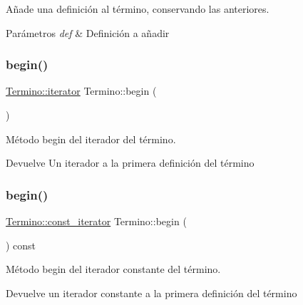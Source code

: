 Añade una definición al término, conservando las anteriores. 


\begin{DoxyParams}{Parámetros}
{\em def} & Definición a añadir \\
\hline
\end{DoxyParams}
\mbox{\label{classTermino_a7ff605c38c22fd1c16573ad2c2900247}} 
\subsubsection{\texorpdfstring{begin()}{begin()}\hspace{0.1cm}{\footnotesize\ttfamily [1/2]}}
{\footnotesize\ttfamily \hyperlink{classTermino_a47bf17fd54656f315aa9257b4372e875}{Termino\+::iterator} Termino\+::begin (\begin{DoxyParamCaption}{ }\end{DoxyParamCaption})}



Método begin del iterador del término. 

\begin{DoxyReturn}{Devuelve}
Un iterador a la primera definición del término 
\end{DoxyReturn}
\mbox{\label{classTermino_abf06215ba85528bc636f337103328345}} 
\subsubsection{\texorpdfstring{begin()}{begin()}\hspace{0.1cm}{\footnotesize\ttfamily [2/2]}}
{\footnotesize\ttfamily \hyperlink{classTermino_a0c8a38779eb1a65b8fe9422b430895c9}{Termino\+::const\+\_\+iterator} Termino\+::begin (\begin{DoxyParamCaption}{ }\end{DoxyParamCaption}) const}



Método begin del iterador constante del término. 

\begin{DoxyReturn}{Devuelve}
un iterador constante a la primera definición del término 
\end{DoxyReturn}
\mbox{\label{classTermino_af23d49a79988f917c61969564002c162}} 
